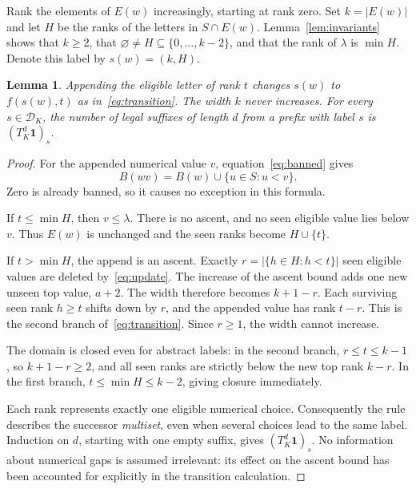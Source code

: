 \documentclass[11pt]{article}
\newtheorem{lemma}[theorem]{Lemma}
\theoremstyle{remark}
\newcommand{\D}{\mathcal D}
\newcommand{\one}{\mathbf 1}
\begin{document}
Rank the elements of $E(w)$ increasingly, starting at rank zero. Set
$k=|E(w)|$ and let $H$ be the ranks of the letters in $S\cap E(w)$.
Lemma~\ref{lem:invariants} shows that $k\geq2$, that
$\varnothing\ne H\subseteq\{0,\ldots,k-2\}$, and that the rank of
$\lambda$ is $\min H$. Denote this label by $s(w)=(k,H)$.

\begin{lemma}\label{lem:quotient}
Appending the eligible letter of rank $t$ changes $s(w)$ to
$f(s(w),t)$ as in~\eqref{eq:transition}. The width $k$ never increases.
For every $s\in\D_K$, the number of legal suffixes of length $d$ from
a prefix with label $s$ is $(T_K^d\one)_s$.
\end{lemma}

\begin{proof}
For the appended numerical value $v$, equation~\eqref{eq:banned} gives
\begin{equation}\label{eq:update}
 B(wv)=B(w)\cup\{u\in S:u<v\}.
\end{equation}
Zero is already banned, so it causes no exception in this formula.

If $t\leq\min H$, then $v\leq\lambda$. There is no ascent, and no seen
eligible value lies below $v$. Thus $E(w)$ is unchanged and the seen
ranks become $H\cup\{t\}$.

If $t>\min H$, the append is an ascent. Exactly
$r=|\{h\in H:h<t\}|$ seen eligible values are deleted by~\eqref{eq:update}.
The increase of the ascent bound adds one new unseen top value, $a+2$.
The width therefore becomes $k+1-r$. Each surviving seen rank $h\geq t$
shifts down by $r$, and the appended value has rank $t-r$. This is the
second branch of~\eqref{eq:transition}. Since $r\geq1$, the width cannot
increase.

The domain is closed even for abstract labels: in the second branch,
$r\leq t\leq k-1$, so $k+1-r\geq2$, and all seen ranks are strictly
below the new top rank $k-r$. In the first branch,
$t\leq\min H\leq k-2$, giving closure immediately.

Each rank represents exactly one eligible numerical choice. Consequently
the rule describes the successor \emph{multiset}, even when several
choices lead to the same label. Induction on $d$, starting with one
empty suffix, gives $(T_K^d\one)_s$. No information about numerical gaps
is assumed irrelevant: its effect on the ascent bound has been accounted
for explicitly in the transition calculation.
\end{proof}
\end{document}
